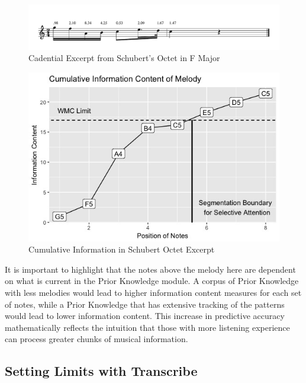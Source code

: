 \documentclass[]{book}
\begin{document}
\begin{figure}

{\centering \includegraphics[width=1\linewidth]{img/SchubertF} 

}

\caption{Cadential Excerpt from Schubert's Octet in F Major}\label{fig:schubertF}
\end{figure}

\begin{figure}

{\centering \includegraphics[width=0.75\linewidth]{img/cumSchubert} 

}

\caption{Cumulative Information in Schubert Octet Excerpt}\label{fig:cumSchubert}
\end{figure}

It is important to highlight that the notes above the melody here are dependent on what is current in the Prior Knowledge module.
A corpus of Prior Knowledge with less melodies would lead to higher information content measures for each set of notes, while a Prior Knowledge that has extensive tracking of the patterns would lead to lower information content.
This increase in predictive accuracy mathematically reflects the intuition that those with more listening experience can process greater chunks of musical information.

\hypertarget{setting-limits-with-transcribe}{%
\subsection{Setting Limits with Transcribe}\label{setting-limits-with-transcribe}}
\end{document}
